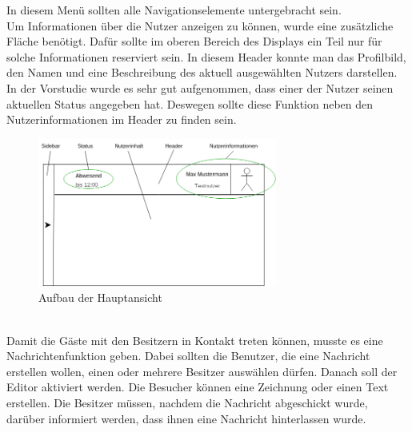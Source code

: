 In diesem Menü sollten alle Navigationselemente untergebracht sein. 
\\
Um Informationen über die Nutzer anzeigen zu können, wurde eine zusätzliche Fläche benötigt.
Dafür sollte im oberen Bereich des Displays ein Teil nur für solche Informationen reserviert sein. 
In diesem Header konnte man das Profilbild, den Namen und eine Beschreibung des aktuell ausgewählten Nutzers darstellen.
In der Vorstudie wurde es sehr gut aufgenommen, dass einer der Nutzer seinen aktuellen Status angegeben hat.
Deswegen sollte diese Funktion neben den Nutzerinformationen im Header zu finden sein.
\begin{figure}[h!]
  \centering
    \includegraphics[width=0.7\textwidth]{./img/MainViewAufbau.png}
  \caption{Aufbau der Hauptansicht}
  \label{img:mainView}
\end{figure}
\\
Damit die Gäste mit den Besitzern in Kontakt treten können, musste es eine Nachrichtenfunktion geben.
Dabei sollten die Benutzer, die eine Nachricht erstellen wollen, einen oder mehrere Besitzer auswählen dürfen.
Danach soll der Editor aktiviert werden.
Die Besucher können eine Zeichnung oder einen Text erstellen.
Die Besitzer müssen, nachdem die Nachricht abgeschickt wurde, darüber informiert werden, dass ihnen eine Nachricht hinterlassen wurde.

